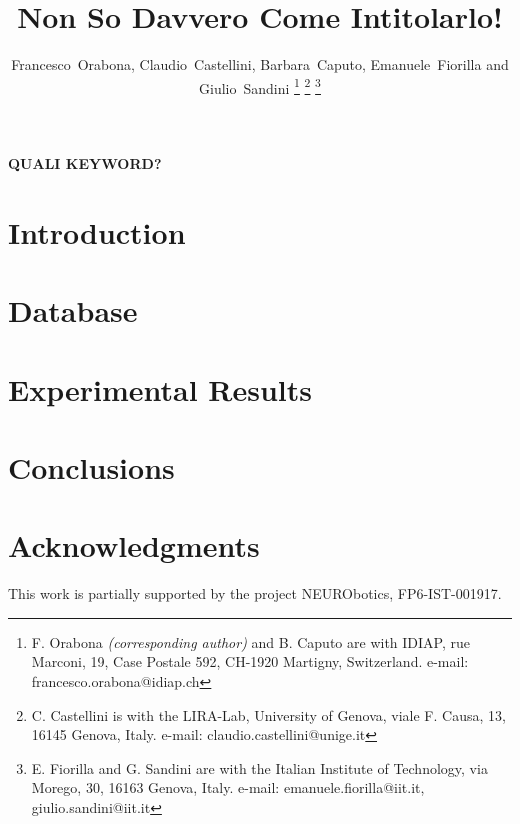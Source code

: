 \documentclass[conference,letterpaper]{IEEEtran}
\begin{document}

\title{Non So Davvero Come Intitolarlo!}

\author{Francesco~Orabona, Claudio~Castellini, Barbara~Caputo, Emanuele~Fiorilla and Giulio~Sandini
\thanks{F. Orabona \emph{(corresponding author)} and B. Caputo
  are with IDIAP,
  rue Marconi, 19, Case Postale 592, CH-1920 Martigny, Switzerland.
  e-mail: francesco.orabona@idiap.ch}%
\thanks{C. Castellini
  is with the LIRA-Lab, University of Genova,
  viale F. Causa, 13, 16145 Genova, Italy.
  e-mail: claudio.castellini@unige.it}%
\thanks{E. Fiorilla and G. Sandini
  are with the Italian Institute of Technology,
  via Morego, 30, 16163 Genova, Italy.
  e-mail: emanuele.fiorilla@iit.it, giulio.sandini@iit.it}%
}

\maketitle

\begin{abstract}
  
\end{abstract}

\begin{IEEEkeywords}
  \textbf{QUALI KEYWORD?}
\end{IEEEkeywords}

\IEEEpeerreviewmaketitle


\section{Introduction}
\label{sec:intro}


\section{Database}
\label{sec:mms}


\section{Experimental Results}
\label{sec:exp}


\section{Conclusions}
\label{sec:concl}



\section*{Acknowledgments}

This work is partially supported by the project NEURObotics,
FP6-IST-001917.

{\small


}
\end{document}
